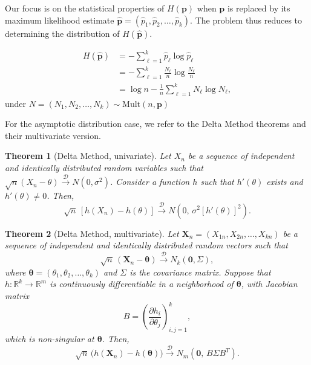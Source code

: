 Our focus is on the statistical properties of $H(\mathbf{p})$ when $\mathbf{p}$ is replaced by its maximum likelihood estimate $\widehat{\mathbf{p}} = (\widehat{p}_1, \widehat{p}_2, \dots, \widehat{p}_k)$. The problem thus reduces to determining the distribution of $H(\widehat{\mathbf{p}})$.

\begin{align}
	H(\widehat{\mathbf{p}})
	&= -\sum_{\ell=1}^k \widehat{p}_\ell \log \widehat{p}_\ell \nonumber \\
	&= -\sum_{\ell=1}^k \frac{N_\ell}{n} \log \frac{N_\ell}{n} \nonumber \\
	&= \log n - \frac{1}{n} \sum_{\ell=1}^k N_\ell \log N_\ell,
\end{align}
under $N=(N_1,N_2,\dots,N_k)\sim \text{Mult}(n,\mathbf{p})$

For the asymptotic distribution case, we refer to the Delta Method theorems and their multivariate version.

\theoremstyle{plain}
\newtheorem{theorem}{Theorem}

\begin{theorem}[Delta Method, univariate]
	Let $X_n$ be a sequence of independent and identically distributed random variables such that 
	$\sqrt{n}(X_n - \theta) \xrightarrow{\mathscr{D}} N(0,\sigma^2)$. 
	Consider a function $h$ such that $h'(\theta)$ exists and $h'(\theta)\neq 0$. 
	Then,
	\[
	\sqrt{n}\,[h(X_n)-h(\theta)] \xrightarrow{\mathscr{D}} N\!\left(0,\,\sigma^2 [h'(\theta)]^2\right).
	\]
\end{theorem}

\begin{theorem}[Delta Method, multivariate]
	Let $\mathbf{X}_n= (X_{1n}, X_{2n}, \dots, X_{kn})$ be a sequence of independent and identically distributed random vectors such that 
	\[
	\sqrt{n}\,(\mathbf{X}_n - \boldsymbol{\theta}) \xrightarrow{\mathscr{D}} N_k(\mathbf{0},\Sigma),
	\]
	where $\boldsymbol{\theta} = (\theta_1,\theta_2,\dots,\theta_k)$ and $\Sigma$ is the covariance matrix. 
	Suppose that $h\colon\mathbb{R}^k \to \mathbb{R}^m$ is continuously differentiable in a neighborhood of $\boldsymbol{\theta}$, with Jacobian matrix
	\[
	B = \left( \frac{\partial h_i}{\partial \theta_j} \right)_{i,j=1}^k,
	\]
	which is non-singular at $\boldsymbol{\theta}$. Then,
	\[
	\sqrt{n}\,\big(h(\mathbf{X}_n)-h(\boldsymbol{\theta})\big) \xrightarrow{\mathscr{D}} N_m\!\left(\mathbf{0},\, B \Sigma B^T\right).
	\]
\end{theorem}

